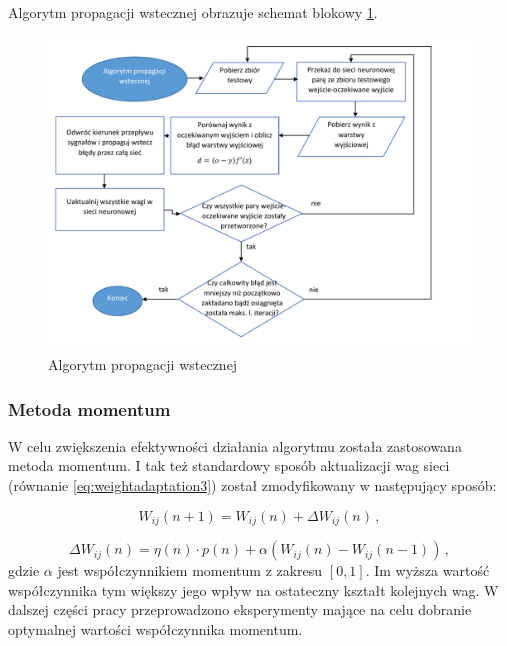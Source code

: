 \documentclass[twoside]{iisthesis}
\begin{document}
		 Algorytm propagacji wstecznej obrazuje schemat blokowy \ref{fig:propagacjawsteczna}.
		 
			\begin{figure}[!ht] 
				\centering
				\includegraphics[width=1\textwidth]{propagacjawsteczna}
				\caption{Algorytm propagacji wstecznej}
				\label{fig:propagacjawsteczna}
			\end{figure}
			
		 \subsubsection{Metoda momentum}
		 \label{sss:metoda_momentum}
	 
		 W celu zwiększenia efektywności działania algorytmu została zastosowana metoda momentum. I tak też standardowy sposób aktualizacji wag sieci (równanie \ref{eq:weightadaptation3}) został zmodyfikowany w następujący sposób:
		 
		 \begin{equation}
		 \label{eq:zasadamomentum1}
		 W_{ij}(n+1) = W_{ij}(n) + \Delta W_{ij}(n) 
		 \,,
		 \end{equation}
		 
		 \begin{equation}
		 \label{eq:zasadamomentum2}
		 \Delta W_{ij}(n) = \eta(n) \cdot p(n) + \alpha(W_{ij}(n)-W_{ij}(n-1)) 
		 \,,
		 \end{equation}		 
		 gdzie $\alpha$ jest współczynnikiem momentum z zakresu $[0,1]$. Im wyższa wartość współczynnika tym większy jego wpływ na ostateczny kształt kolejnych wag. W dalszej części pracy przeprowadzono eksperymenty mające na celu dobranie optymalnej wartości współczynnika momentum.
		 
\end{document}
